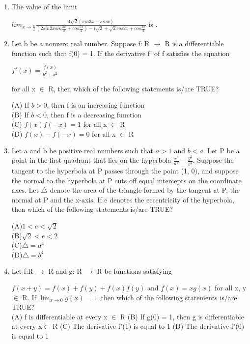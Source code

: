 \documentclass{article}
\begin{document}
\begin{enumerate}
\item The value of the limit
         
	 $lim_{x \to \frac{\pi}{2}}\frac{4\sqrt{2}(sin3x + sinx)}{(2 sin2xsin\frac{3x}{2} + cos\frac{5x}{2}) - (\sqrt{2}+\sqrt{2}cos2x + cos\frac{3x}{2}}$ is \underline{\hspace{1cm}}.

\item Let b be a nonzero real number. Suppose f: R $\to$ R is a differentiable function such that f(0) = 1.
If the derivative f' of f satisfies the equation
               
	       $f'(x) = \frac{f(x)}{b^2 + x^2}$
	       
for all x $\in$ R, then which of the following statements is/are TRUE?

(A) If $b > 0$, then f is an increasing function\\
(B) If $b < 0$, then f is a decreasing function \\
(C) $f(x)f(-x) = 1$ for all x $\in$ R\\
(D) $f(x) - f(-x) = 0$ for all x $\in$ R

\item Let a and b be positive real numbers such that $a > 1$ and $b < a$. Let P be a point in the first quadrant that lies on the hyperbola $\frac{x^2}{a^2} - \frac{y^2}{b^2}$. Suppose the tangent to the hyperbola at P passes through the point (1, 0), and suppose the normal to the hyperbola at P cuts off equal intercepts on the coordinate axes. Let $\triangle$ denote the area of the triangle formed by the tangent at P, the normal at P and the x-axis. If e denotes the eccentricity of the hyperbola, then which of the following statements is/are TRUE?
			
	
(A)$1< e <\sqrt{2}$\\
(B)$\sqrt{2}< e <2$\\
(C)$\triangle = a^4$\\
(D)$\triangle = b^4$
	

\item Let f:R $\to$ R and g: R $\to$ R be functions satisfying

$f(x + y) = f(x) + f(y) + f(x)f(y)$ and $f(x) = xg(x)$
for all x, y $\in$ R. If $\lim_{x \to 0}g(x) = 1$
,then which of the following statements is/are TRUE?\\

(A) f is differentiable at every x $\in$ R
(B) If g(0) = 1, then g is differentiable at every x$\in$ R
(C) The derivative f'(1) is equal to 1
(D) The derivative f'(0) is equal to 1


\end{enumerate}
\end{document}
